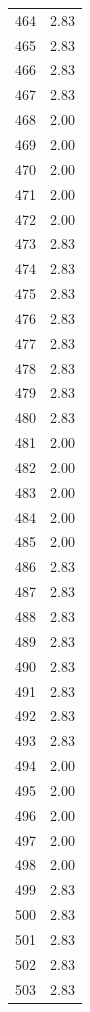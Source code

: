 \documentclass[a4paper,11pt]{article}
\begin{document}
\begin{center}
\begin{longtable}{|R{1.5cm}|R{2.5cm}|}
  464  &         2.83 \\ 
  465  &         2.83 \\ 
  466  &         2.83 \\ 
  467  &         2.83 \\ 
  468  &         2.00 \\ 
  469  &         2.00 \\ 
  470  &         2.00 \\ 
  471  &         2.00 \\ 
  472  &         2.00 \\ 
  473  &         2.83 \\ 
  474  &         2.83 \\ 
  475  &         2.83 \\ 
  476  &         2.83 \\ 
  477  &         2.83 \\ 
  478  &         2.83 \\ 
  479  &         2.83 \\ 
  480  &         2.83 \\ 
  481  &         2.00 \\ 
  482  &         2.00 \\ 
  483  &         2.00 \\ 
  484  &         2.00 \\ 
  485  &         2.00 \\ 
  486  &         2.83 \\ 
  487  &         2.83 \\ 
  488  &         2.83 \\ 
  489  &         2.83 \\ 
  490  &         2.83 \\ 
  491  &         2.83 \\ 
  492  &         2.83 \\ 
  493  &         2.83 \\ 
  494  &         2.00 \\ 
  495  &         2.00 \\ 
  496  &         2.00 \\ 
  497  &         2.00 \\ 
  498  &         2.00 \\ 
  499  &         2.83 \\ 
  500  &         2.83 \\ 
  501  &         2.83 \\ 
  502  &         2.83 \\ 
  503  &         2.83 \\ 

\end{longtable}
\end{center}
\end{document}
